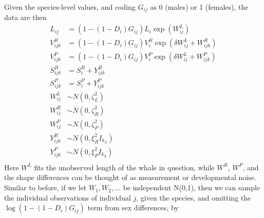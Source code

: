 \documentclass{article}
\begin{document}
Given the species-level values,
and coding $G_{ij}$ as 0 (males) or 1 (females),
the data are then
\begin{align}
    L_{ij} &= (1-(1-D_i)G_{ij}) L_i \exp( W^L_{ij} ) \\
    V^R_{ijk} &= (1-(1-D_i)G_{ij}) V^R_i \exp( \delta W^L_{ij} + W^R_{ijk} ) \\
    V^P_{ijk} &= (1-(1-D_i)G_{ij}) V^P_i \exp( \delta W^L_{ij} + W^P_{ijk} ) \\
    S^R_{ijk} &= S^R_i + Y^R_{ijk} \\
    S^P_{ijk} &= S^P_i + Y^P_{ijk} \\
    W^L_{ij} &\sim N(0,\zeta^2_L) \\
    W^R_{ij} &\sim N(0,\zeta^2_R) \\
    W^P_{ij} &\sim N(0,\zeta^2_P) \\
    Y^R_{ijk} &\sim N(0,\xi^2_R I_{k_S}) \\
    Y^P_{ijk} &\sim N(0,\xi^2_P I_{k_S}) \\
\end{align}
Here $W^L$ fits the unobserved length of the whale in question,
while $W^R$, $W^P$, and the shape differences can be thought of as measurement or developmental noise.
Similar to before, if we let $W_1, W_2, \ldots$ be independent N(0,1), 
then we can sample the individual observations of individual $j$, given the species, 
and omitting the 
$\log\left( 1-(1-D_i)G_{ij} \right)$ term from sex differences, by
\end{document}
